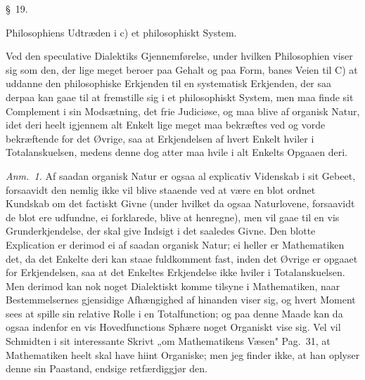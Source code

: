 \documentclass[12pt,a4paper]{book}
\newcommand{\apage}[1]{\marginnote{\footnotesize\textit{[#1]}}}
\begin{document}
\begin{center}\large\S~19.\end{center}
\begin{center}Philosophiens Udtræden i c) et philosophiskt System.\end{center}

Ved den speculative Dialektiks Gjennemførelse, under hvilken Philosophien viser sig
som den, der lige meget beroer paa Gehalt og paa Form, banes Veien til C) at
uddanne den philosophiske Erkjenden til en systematisk Erkjenden, der saa derpaa kan
gaae til at fremstille sig i et philosophiskt System, men maa finde sit Complement i
sin Modsætning, det frie Judiciøse, og maa blive af organisk Natur, idet deri heelt
igjennem alt Enkelt lige meget maa bekræftes ved og vorde bekræftende for det Øvrige,
saa at Erkjendelsen af hvert Enkelt hviler i Totalanskuelsen, medens denne dog atter
maa hvile i alt Enkelts Opgaaen deri.

{\small\emph{Anm.~1.} Af saadan organisk Natur er ogsaa al explicativ Videnskab i
sit Gebeet, forsaavidt den nemlig ikke vil blive staaende ved at være en blot ordnet
Kundskab om det factiskt Givne (under hvilket da ogsaa Naturlovene, forsaavidt de
blot ere udfundne, ei forklarede, blive at henregne), men vil gaae til en vis
Grunderkjendelse, der skal give Indsigt i det saaledes Givne. Den blotte Explication
er derimod ei af saadan organisk Natur; ei heller er Mathematiken det, da det Enkelte
deri kan staae fuldkomment fast, inden det Øvrige er opgaaet for Erkjendelsen, saa at
det Enkeltes Erkjendelse ikke hviler i Totalanskuelsen. Men derimod kan nok noget
Dialektiskt komme tilsyne i Mathematiken, naar Bestemmelsernes gjensidige Afhængighed
af hinanden viser sig, og hvert Moment sees at spille sin relative Rolle i en
Totalfunction; og paa denne Maade kan da ogsaa indenfor en vis Hovedfunctions Sphære
noget Organiskt vise sig. Vel vil Schmidten i sit interessante Skrivt „om
Mathematikens Væsen" Pag.\ 31, at Mathematiken heelt skal have hiint Organiske; men
jeg finder ikke, at han oplyser denne sin Paastand, endsige retfærdiggjør den.\par} \apage{72} 
\end{document}
